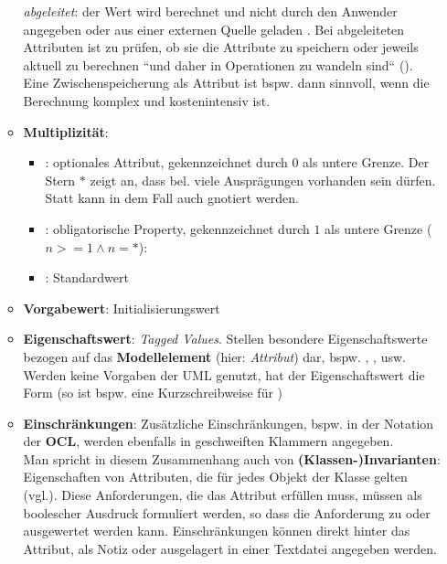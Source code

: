 \begin{itemize}
\begin{itemize}
{            \textit{abgeleitet}: der Wert wird berechnet und nicht durch den Anwender angegeben oder aus einer externen Quelle geladen
        }. Bei abgeleiteten Attributen ist zu prüfen, ob sie  die Attribute zu speichern oder jeweils aktuell zu berechnen ``und daher in Operationen zu wandeln sind`` (\cite[414]{Bal05}). Eine Zwischenspeicherung als Attribut ist bspw. dann sinnvoll, wenn die Berechnung komplex und kostenintensiv ist.
        \item \textbf{Multiplizität}:
        \begin{itemize}
            \item \code{[0..*]}: optionales Attribut, gekennzeichnet durch $0$ als untere Grenze.
            Der Stern $*$ zeigt an, dass bel. viele Ausprägungen vorhanden sein dürfen.
            Statt \code{[0..*]} kann in dem Fall auch \code{[*]} gnotiert werden.
            \item \code{[1..n]}: obligatorische Property, gekennzeichnet durch $1$ als untere Grenze ($n >= 1 \land n=*$):
            \item \code{[1]}: Standardwert
        \end{itemize}
        \item \textbf{Vorgabewert}: Initialisierungswert
        \item \textbf{Eigenschaftswert}: \textit{Tagged Values}.
        Stellen besondere Eigenschaftswerte bezogen auf das \textbf{Modellelement} (hier: \textit{Attribut}) dar, {bspw.} , ,  usw. Werden keine Vorgaben der UML genutzt, hat der Eigenschaftswert die Form  (so ist bspw.  eine Kurzschreibweise für  )
        \item \textbf{Einschränkungen}: Zusätzliche Einschränkungen, bspw. in der Notation der \textbf{OCL}, werden ebenfalls in geschweiften Klammern angegeben.\\
        Man spricht in diesem Zusammenhang auch von \textbf{(Klassen-)Invarianten}: Eigenschaften von Attributen, die für jedes Objekt der Klasse gelten (vgl.\cite[338]{Oes05}).
        Diese Anforderungen, die das Attribut erfüllen muss, müssen als boolescher Ausdruck formuliert werden, so dass die Anforderung zu  oder  ausgewertet werden kann.
        Einschränkungen können direkt hinter das Attribut, als Notiz oder ausgelagert in einer Textdatei angegeben werden.
    \end{itemize}

\end{itemize}

